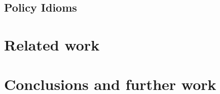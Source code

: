 \documentclass[a4paper]{scrartcl}
\newcommand{\comment}[1]{}%
\begin{document}
\subsection{Policy Idioms}
\label{ssec:idioms}


\section{Related work \comment{1--2 pages}}

\section{Conclusions and further work \comment{$\frac{1}{2}$ page}}



\end{document}
